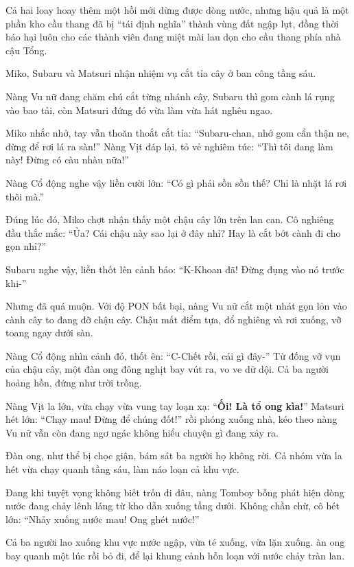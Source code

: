 \documentclass[../main.tex]{subfiles}
\begin{document}
Cả hai loay hoay thêm một hồi mới dừng được dòng nước, nhưng hậu quả là một phần kho cầu thang đã bị ``tái định nghĩa'' thành vùng đất ngập lụt, đồng thời báo hại luôn cho các thành viên đang miệt mài lau dọn cho cầu thang phía nhà cậu Tổng.

\ct

Miko, Subaru và Matsuri nhận nhiệm vụ cắt tỉa cây ở ban công tầng sáu.

Nàng Vu nữ đang chăm chú cắt từng nhánh cây, Subaru thì gom cành lá rụng vào bao tải, còn Matsuri đứng đó vừa làm vừa hát nghêu ngao.

Miko nhắc nhở, tay vẫn thoăn thoắt cắt tỉa: ``Subaru-chan, nhớ gom cẩn thận ne, đừng để rơi lá ra sàn!'' Nàng Vịt đáp lại, tỏ vẻ nghiêm túc: ``Thì tôi đang làm này! Đừng có càu nhàu nữa!''

Nàng Cổ động nghe vậy liền cười lớn: ``Có gì phải sồn sồn thế? Chỉ là nhặt lá rơi thôi mà.''

Đúng lúc đó, Miko chợt nhận thấy một chậu cây lớn trên lan can. Cô nghiêng đầu thắc mắc: ``Ủa? Cái chậu này sao lại ở đây nhỉ? Hay là cắt bớt cành đi cho gọn nhỉ?''

Subaru nghe vậy, liền thốt lên cảnh báo: ``K-Khoan đã! Đừng đụng vào nó trước khi-''

Nhưng đã quá muộn. Với độ PON bất bại, nàng Vu nữ cắt một nhát gọn lỏn vào cành cây to đang đỡ chậu cây. Chậu mất điểm tựa, đổ nghiêng và rơi xuống, vỡ toang ngay dưới sàn.

Nàng Cổ động nhìn cảnh đó, thốt ên: ``C-Chết rồi, cái gì đây-'' Từ đống vỡ vụn của chậu cây, một đàn ong đông nghịt bay vút ra, vo ve dữ dội. Cả ba người hoảng hồn, đứng như trời trồng.

Nàng Vịt la lớn, vừa chạy vừa vung tay loạn xạ: ``\textbf{Ối! Là tổ ong kìa!}'' Matsuri hét lớn: ``Chạy mau! Đừng để chúng đốt!'' rồi phóng xuống nhà, kéo theo nàng Vu nữ vẫn còn đang ngơ ngác không hiểu chuyện gì đang xảy ra.

Đàn ong, như thể bị chọc giận, bám sát ba người họ không rời. Cả nhóm vừa la hét vừa chạy quanh tầng sáu, làm náo loạn cả khu vực.

Đang khi tuyệt vọng không biết trốn đi đâu, nàng Tomboy bỗng phát hiện dòng nước đang chảy lênh láng từ kho dẫn xuống tầng dưới. Không chần chừ, cô hét lớn: ``Nhảy xuống nước mau! Ong ghét nước!''

Cả ba người lao xuống khu vực nước ngập, vừa té xuống, vừa lặn xuống. àn ong bay quanh một lúc rồi bỏ đi, để lại khung cảnh hỗn loạn với nước chảy tràn lan.
\end{document}
